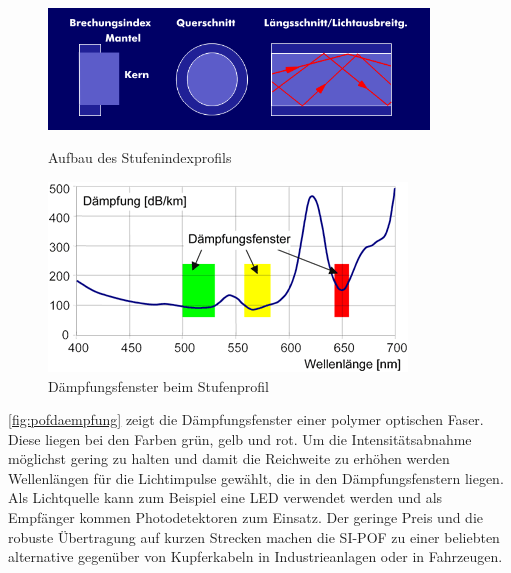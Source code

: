 \begin{figure}[h]
    \begin{center}
        \begin{minipage}[t]{0.4\textwidth}
            \begin{center}
                \includegraphics[width=0.9\textwidth]{Bilder/Optische_Wellenleiter_Die_Polymer_Optische_Faser/Brechzahlprofile/pofsi.png}
                \caption[Aufbau des Stufenindexprofils \newline \url{http://www.itwissen.info/bilder/aufbau-und-brechungsprofil-der-stufenindex-profilfaser.png}]{Aufbau des Stufenindexprofils}
                \label{fig:pofsi}
            \end{center}
        \end{minipage}
        \hspace{0.025\textwidth}
        \begin{minipage}[t]{0.4\textwidth}
            \begin{center}
                \includegraphics[height=0.1\textheight]{Bilder/Optische_Wellenleiter_Die_Polymer_Optische_Faser/Funktionsweise/pofdaempfung.png}
                \caption[Dämpfungsfenster bei einer polymer optischen Faser \newline \url{http://www.pofac.fh-nuernberg.de/pofac/de/was_sind_pof/images/pmma_daempfung.png}]{Dämpfungsfenster beim Stufenprofil}
                \label{fig:pofdaempfung}
            \end{center}
        \end{minipage}
    \end{center}
\end{figure}


\autoref{fig:pofdaempfung} zeigt die Dämpfungsfenster einer polymer optischen
Faser. Diese liegen bei den Farben grün, gelb und rot. Um die Intensitätsabnahme
möglichst gering zu halten und damit die Reichweite zu erhöhen werden
Wellenlängen für die Lichtimpulse gewählt, die in den Dämpfungsfenstern liegen.
Als Lichtquelle kann zum Beispiel eine LED verwendet werden und als Empfänger
kommen Photodetektoren zum Einsatz. Der geringe Preis und die robuste
Übertragung auf kurzen Strecken machen die SI-POF zu einer beliebten alternative
gegenüber von Kupferkabeln in Industrieanlagen oder in Fahrzeugen. \cite{poflee}
